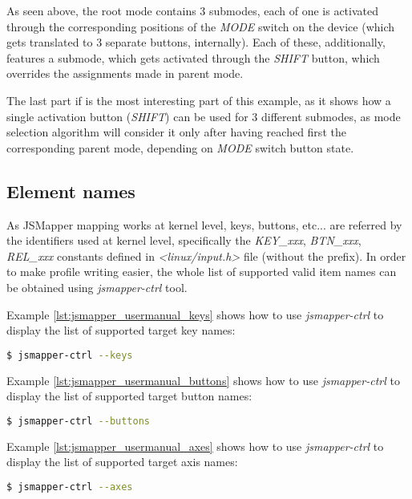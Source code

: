 As seen above, the root mode contains 3 submodes, each of one is activated through the corresponding positions of the \emph{MODE} switch on the device (which gets translated to 3 separate buttons, internally). Each of these, additionally, features a submode, which gets activated through the \emph{SHIFT} button, which overrides the assignments made in parent mode.

The last part if is the most interesting part of this example, as it shows how a single activation button (\emph{SHIFT}) can be used for 3 different submodes, as mode selection algorithm will consider it only after having reached first the corresponding parent mode, depending on \emph{MODE} switch button state.

\subsection{Element names}\label{chap:usermanual_elem_names}
As JSMapper mapping works at kernel level, keys, buttons, etc... are referred by the identifiers used at kernel level, specifically the \emph{KEY\_xxx}, \emph{BTN\_xxx}, \emph{REL\_xxx} constants defined in \emph{<linux/input.h>} file (without the prefix). In order to make profile writing easier, the whole list of supported valid item names can be obtained using \emph{jsmapper-ctrl} tool.

Example \ref{lst:jsmapper_usermanual_keys} shows how to use \emph{jsmapper-ctrl} to display the list of supported target key names:
\begin{lstlisting}[language=bash,caption={Obtaining target key names},label={lst:jsmapper_usermanual_keys}]
$ jsmapper-ctrl --keys
\end{lstlisting}

Example \ref{lst:jsmapper_usermanual_buttons} shows how to use \emph{jsmapper-ctrl} to display the list of supported target button names:
\begin{lstlisting}[language=bash,caption={Obtaining target button names},label={lst:jsmapper_usermanual_buttons}]
$ jsmapper-ctrl --buttons
\end{lstlisting}

Example \ref{lst:jsmapper_usermanual_axes} shows how to use \emph{jsmapper-ctrl} to display the list of supported target axis names:
\begin{lstlisting}[language=bash,caption={Obtaining target axis names},label={lst:jsmapper_usermanual_axes}]
$ jsmapper-ctrl --axes
\end{lstlisting}

